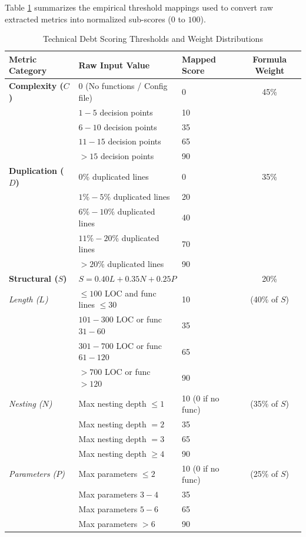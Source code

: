 Table \ref{tab:risk_thresholds} summarizes the empirical threshold mappings used to convert raw extracted metrics into normalized sub-scores ($0$ to $100$).

\begin{table}[htbp]
\centering
\caption{Technical Debt Scoring Thresholds and Weight Distributions}
\label{tab:risk_thresholds}
\vspace{0.2cm}
\begin{tabular}{lllc}
\toprule
\textbf{Metric Category} & \textbf{Raw Input Value} & \textbf{Mapped Score} & \textbf{Formula Weight} \\
\midrule
\textbf{Complexity ($C$)} & 0 (No functions / Config file) & 0 & 45\% \\
& $1 - 5$ decision points & 10 & \\
& $6 - 10$ decision points & 35 & \\
& $11 - 15$ decision points & 65 & \\
& $> 15$ decision points & 90 & \\
\midrule
\textbf{Duplication ($D$)} & 0\% duplicated lines & 0 & 35\% \\
& $1\% - 5\%$ duplicated lines & 20 & \\
& $6\% - 10\%$ duplicated lines & 40 & \\
& $11\% - 20\%$ duplicated lines & 70 & \\
& $> 20\%$ duplicated lines & 90 & \\
\midrule
\textbf{Structural ($S$)} & \multicolumn{2}{l}{$S = 0.40L + 0.35N + 0.25P$} & 20\% \\
\quad \textit{Length ($L$)} & $\le 100$ LOC and func lines $\le 30$ & 10 & (40\% of $S$) \\
& $101 - 300$ LOC or func $31 - 60$ & 35 & \\
& $301 - 700$ LOC or func $61 - 120$ & 65 & \\
& $> 700$ LOC or func $> 120$ & 90 & \\
\quad \textit{Nesting ($N$)} & Max nesting depth $\le 1$ & 10 (0 if no func) & (35\% of $S$) \\
& Max nesting depth $= 2$ & 35 & \\
& Max nesting depth $= 3$ & 65 & \\
& Max nesting depth $\ge 4$ & 90 & \\
\quad \textit{Parameters ($P$)} & Max parameters $\le 2$ & 10 (0 if no func) & (25\% of $S$) \\
& Max parameters $3 - 4$ & 35 & \\
& Max parameters $5 - 6$ & 65 & \\
& Max parameters $> 6$ & 90 & \\
\bottomrule
\end{tabular}
\end{table}

